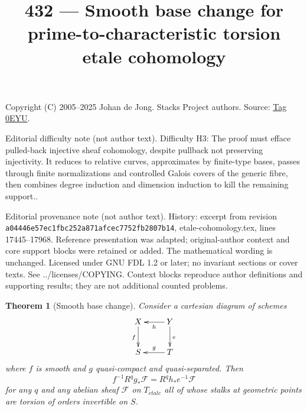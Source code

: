 \documentclass{amsart}
\theoremstyle{plain}
\newtheorem{theorem}[subsection]{Theorem}
\theoremstyle{definition}
\theoremstyle{remark}
\numberwithin{equation}{subsection}
\def\etale{{\acute{e}tale}}
\begin{document}
\title[Stacks Project, Tag 0EYU]{432 --- Smooth base change for prime-to-characteristic torsion etale cohomology}
\maketitle
\noindent Copyright (C) 2005--2025 Johan de Jong. Stacks Project authors. Source: \href{https://stacks.math.columbia.edu/tag/0EYU}{Tag 0EYU}.

\noindent Editorial difficulty note (not author text). Difficulty H3: The proof must efface pulled-back injective sheaf cohomology, despite pullback not preserving injectivity. It reduces to relative curves, approximates by finite-type bases, passes through finite normalizations and controlled Galois covers of the generic fibre, then combines degree induction and dimension induction to kill the remaining support..

\noindent Editorial provenance note (not author text). History: excerpt from revision \texttt{a0444\allowbreak 6e57e\allowbreak c1fbc\allowbreak 252a8\allowbreak 71afc\allowbreak ec775\allowbreak 2fb28\allowbreak 07b14}, etale-cohomology.tex, lines 17445--17968. Reference presentation was adapted; original-author context and core support blocks were retained or added. The mathematical wording is unchanged. Licensed under GNU FDL 1.2 or later; no invariant sections or cover texts. See ../licenses/COPYING. Context blocks reproduce author definitions and supporting results; they are not additional counted problems.

\begin{theorem}[Smooth base change]
\label{theorem-smooth-base-change}
Consider a cartesian diagram of schemes
$$
\xymatrix{
X \ar[d]_f & Y \ar[l]^h \ar[d]^e \\
S & T \ar[l]_g
}
$$
where $f$ is smooth and $g$ quasi-compact and quasi-separated. Then
$$
f^{-1}R^qg_*\mathcal{F} = R^qh_*e^{-1}\mathcal{F}
$$
for any $q$ and any abelian sheaf $\mathcal{F}$
on $T_\etale$ all of whose stalks at geometric points are torsion of
orders invertible on $S$.
\end{theorem}
\end{document}
